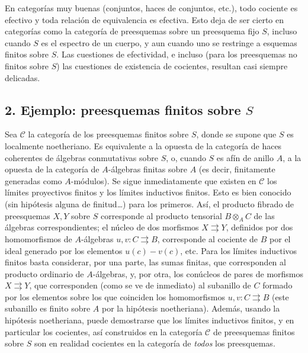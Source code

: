 En categorías muy buenas (conjuntos, haces de conjuntos, etc.), todo cociente
es efectivo y toda relación de equivalencia es efectiva. Esto deja de ser
cierto en categorías como la categoría de preesquemas sobre un preesquema fijo
$S$, incluso cuando $S$ es el espectro de un cuerpo, y aun cuando uno se
restringe a esquemas finitos sobre $S$. Las cuestiones de efectividad, e
incluso (para los preesquemas no finitos sobre $S$) las cuestiones de
existencia de cocientes, resultan casi siempre delicadas.

\subsection*{2. Ejemplo: preesquemas finitos sobre $S$}

Sea $\mathcal C$ la categoría de los preesquemas finitos sobre $S$, donde se
supone que $S$ es localmente noetheriano. Es equivalente a la opuesta de la
categoría de haces coherentes de álgebras conmutativas sobre $S$, o, cuando
$S$ es afín de anillo $A$, a la opuesta de la categoría de $A$-álgebras
finitas sobre $A$ (es decir, finitamente generadas como $A$-módulos). Se sigue
inmediatamente que existen en $\mathcal C$ los límites proyectivos finitos y
los límites inductivos finitos. Esto es bien conocido (sin hipótesis alguna
de finitud\ldots) para los primeros. Así, el producto fibrado de preesquemas
$X,Y$ sobre $S$ corresponde al producto tensorial $B\otimes_A C$ de las
álgebras correspondientes; el núcleo de dos morfismos
$X\rightrightarrows Y$, definidos por dos homomorfismos de $A$-álgebras
$u,v:C\rightrightarrows B$, corresponde al cociente de $B$ por el ideal
generado por los elementos $u(c)-v(c)$, etc. Para los límites inductivos
finitos basta considerar, por una parte, las sumas finitas, que corresponden
al producto ordinario de $A$-álgebras, y, por otra, los conúcleos de pares de
morfismos $X\rightrightarrows Y$, que corresponden (como se ve de inmediato)
al subanillo de $C$ formado por los elementos sobre los que coinciden los
homomorfismos $u,v:C\rightrightarrows B$ (este subanillo es finito sobre $A$
por la hipótesis noetheriana). Además, usando la hipótesis noetheriana, puede
demostrarse que los límites inductivos finitos, y en particular los cocientes,
así construidos en la categoría $\mathcal C$ de preesquemas finitos sobre $S$
son en realidad cocientes en la categoría de \emph{todos} los preesquemas.

